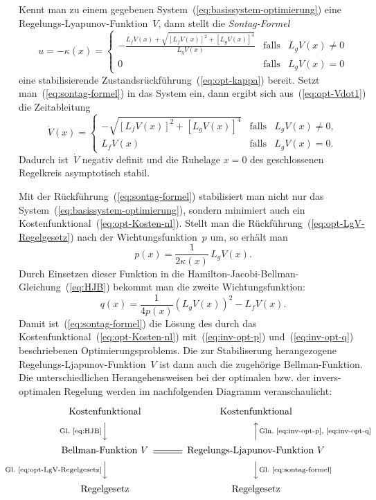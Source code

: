 Kennt man zu einem gegebenen System~(\ref{eq:basissystem-optimierung})
eine Regelungs-Lyapunov-Funktion~$V$, dann stellt die \emph{Sontag-Formel}~\cite{sontag89,sontag98}
\begin{equation}
u=-\kappa(x)=\left\{ \begin{array}{ccc}
-\frac{L_{f}V(x)+\sqrt{\left[L_{f}V(x)\right]^{2}+\left[L_{g}V(x)\right]^{4}}}{L_{g}V(x)} & \text{falls} & L_{g}V(x)\neq0\\
0 & \text{falls} & L_{g}V(x)=0
\end{array}\right.\label{eq:sontag-formel}
\end{equation}
eine stabilisierende Zustandsrückführung~(\ref{eq:opt-kappa}) bereit.
Setzt man~(\ref{eq:sontag-formel}) in das System ein, dann ergibt
sich aus~(\ref{eq:opt-Vdot1}) die Zeitableitung
\[
\dot{V}(x)=\left\{ \begin{array}{ccc}
-\sqrt{\left[L_{f}V(x)\right]^{2}+\left[L_{g}V(x)\right]^{4}} & \text{falls} & L_{g}V(x)\neq0,\\
L_{f}V(x) & \text{falls} & L_{g}V(x)=0.
\end{array}\right.
\]
Dadurch ist~$\dot{V}$ negativ definit und die Ruhelage $x=0$ des
geschlossenen Regelkreis asymptotisch stabil.

Mit der Rückführung~(\ref{eq:sontag-formel}) stabilisiert man nicht
nur das System~(\ref{eq:basissystem-optimierung}), sondern minimiert
auch ein Kostenfunktional~(\ref{eq:opt-Kosten-nl}). Stellt man die
Rückführung~(\ref{eq:opt-LgV-Regelgesetz}) nach der Wichtungsfunktion~$p$
um, so erhält man 
\begin{equation}
p(x)=\frac{1}{2\kappa(x)}\,L_{g}V(x).\label{eq:inv-opt-p}
\end{equation}
Durch Einsetzen dieser Funktion in die Hamilton-Jacobi-Bellman-Gleichung~(\ref{eq:HJB})
bekommt man die zweite Wichtungsfunktion:
\begin{equation}
q(x)=\frac{1}{4p(x)}\left(L_{g}V(x)\right)^{2}-L_{f}V(x).\label{eq:inv-opt-q}
\end{equation}
Damit ist~(\ref{eq:sontag-formel}) die Lösung des durch das Kostenfunktional~(\ref{eq:opt-Kosten-nl})
mit~(\ref{eq:inv-opt-p}) und~(\ref{eq:inv-opt-q}) beschriebenen
Optimierungsproblems. Die zur Stabiliserung herangezogene Regelungs-Ljapunov-Funktion~$V$
ist dann auch die zugehörige Bellman-Funktion. Die unterschiedlichen
Herangehensweisen bei der optimalen bzw. der invers-optimalen Regelung
werden im nachfolgenden Diagramm veranschaulicht:

\[
\begin{CD}
\text{Kostenfunktional} @. \text{Kostenfunktional}\\
@V{\text{Gl.~\eqref{eq:HJB}}}VV @ AA{\text{Gln.~\eqref{eq:inv-opt-p}, \eqref{eq:inv-opt-q}}}A\\
\text{Bellman-Funktion}~V @= \text{Regelungs-Ljapunov-Funktion}~V\\
@V{\text{Gl.~\eqref{eq:opt-LgV-Regelgesetz}}}VV @VV{\text{Gl.~\eqref{eq:sontag-formel}}}V\\
\text{Regelgesetz} @. \text{Regelgesetz}
\end{CD}
\]

